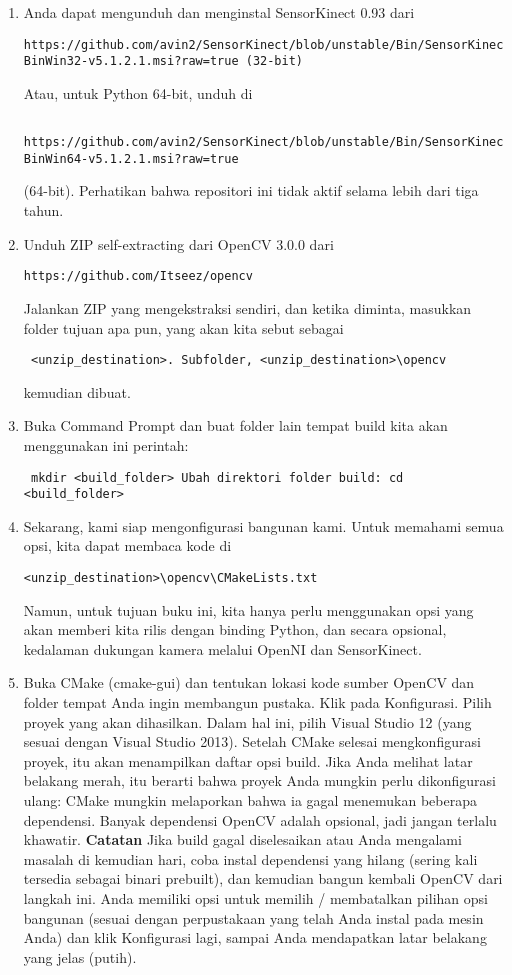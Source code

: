 \begin{enumerate}
	\item Anda dapat mengunduh dan menginstal SensorKinect 0.93 dari \begin{verbatim}https://github.com/avin2/SensorKinect/blob/unstable/Bin/SensorKinect093-BinWin32-v5.1.2.1.msi?raw=true (32-bit) \end{verbatim} Atau, untuk Python 64-bit, unduh di \begin{verbatim} https://github.com/avin2/SensorKinect/blob/unstable/Bin/SensorKinect093-BinWin64-v5.1.2.1.msi?raw=true \end{verbatim}(64-bit). Perhatikan bahwa repositori ini tidak aktif selama lebih dari tiga tahun.
	\item Unduh ZIP self-extracting dari OpenCV 3.0.0 dari \begin{verbatim}https://github.com/Itseez/opencv \end{verbatim} Jalankan ZIP yang mengekstraksi sendiri, dan ketika diminta, masukkan folder tujuan apa pun, yang akan kita sebut sebagai \begin{verbatim} <unzip_destination>. Subfolder, <unzip_destination>\opencv \end{verbatim} kemudian dibuat.
	\item Buka Command Prompt dan buat folder lain tempat build kita akan menggunakan ini perintah:\begin{verbatim} mkdir <build_folder> Ubah direktori folder build: cd <build_folder> \end{verbatim}
	\item Sekarang, kami siap mengonfigurasi bangunan kami. Untuk memahami semua opsi, kita dapat membaca kode di \begin{verbatim}<unzip_destination>\opencv\CMakeLists.txt \end{verbatim} Namun, untuk tujuan buku ini, kita hanya perlu menggunakan opsi yang akan memberi kita rilis dengan binding Python, dan secara opsional, kedalaman dukungan kamera melalui OpenNI dan SensorKinect.
	\item Buka CMake (cmake-gui) dan tentukan lokasi kode sumber OpenCV dan folder tempat Anda ingin membangun pustaka. Klik pada Konfigurasi. Pilih proyek yang akan dihasilkan. Dalam hal ini, pilih Visual Studio 12 (yang sesuai dengan Visual Studio 2013). Setelah CMake selesai mengkonfigurasi proyek, itu akan menampilkan daftar opsi build. Jika Anda melihat latar belakang merah, itu berarti bahwa proyek Anda mungkin perlu dikonfigurasi ulang: CMake mungkin melaporkan bahwa ia gagal menemukan beberapa dependensi. Banyak dependensi OpenCV adalah opsional, jadi jangan terlalu khawatir. \textbf{Catatan}  Jika build gagal diselesaikan atau Anda mengalami masalah di kemudian hari, coba instal dependensi yang hilang (sering kali tersedia sebagai binari prebuilt), dan kemudian bangun kembali OpenCV dari langkah ini. Anda memiliki opsi untuk memilih / membatalkan pilihan opsi bangunan (sesuai dengan perpustakaan yang telah Anda instal pada mesin Anda) dan klik Konfigurasi lagi, sampai Anda mendapatkan latar belakang yang jelas (putih).

\end{enumerate}
